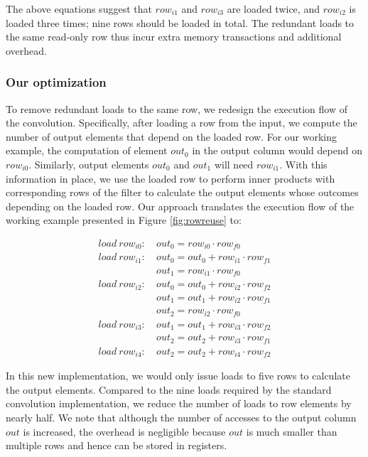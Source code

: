 The above equations suggest that $row_{i1}$ and $row_{i3}$ are loaded twice, and $row_{i2}$ is loaded three times; nine rows should be loaded in total. 
The redundant loads to the same read-only row thus incur extra memory transactions and additional overhead.

\subsubsection{Our optimization}
To remove redundant loads to the same row, we redesign the execution flow of the convolution. 
Specifically, after loading a row from the input, we compute the number of output elements that depend on the loaded row. 
For our working example, the computation of element $out_0$ in the output column would depend on $row_{i0}$. 
Similarly, output elements $out_0$ and $out_1$ will need $row_{i1}$. With this information in place, we use the loaded row to perform inner products with corresponding rows of the filter to calculate the output elements whose outcomes depending on the loaded row. 
Our approach translates the execution flow of the working example presented in Figure \ref {fig:rowreuse} to:

\begin{equation}\nonumber
\begin{aligned}
load\ row_{i0}:
&\ out_0=row_{i0} \cdot row_{f0} \\
load\ row_{i1}:
&\ out_0 = out_0+row_{i1} \cdot row_{f1}\\
&\ out_1=row_{i1} \cdot row_{f0}\\
load\ row_{i2}:
&\ out_0 = out_0+row_{i2} \cdot row_{f2}\\
&\ out_1 = out_1+row_{i2} \cdot row_{f1}\\
&\ out_{2}=row_{i2} \cdot row_{f0}\\
load\ row_{i3}:
&\ out_1=out_1+row_{i3} \cdot row_{f2} \\
&\ out_2=out_2+row_{i3} \cdot row_{f1}\\
load\ row_{i4}:
&\ out_2=out_2+row_{i4} \cdot row_{f2}
\end{aligned}	
\end{equation}

In this new implementation, we would only issue loads to five rows to calculate the output elements. 
Compared to the nine loads required by the standard convolution implementation, we reduce the number of loads to row elements by nearly half.  
We note that although the number of accesses to the output column $out$ is increased, the overhead is negligible because $out$ is much smaller than multiple rows and hence can be stored in registers.

